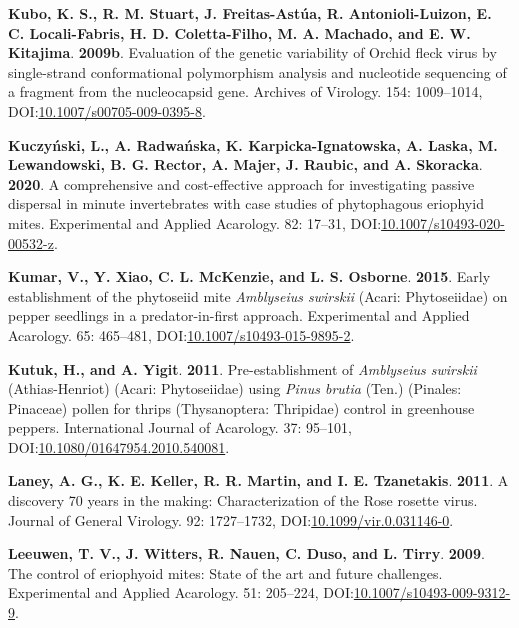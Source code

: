 \documentclass[12pt,final,CPage]{ufthesis}
\newlength{\cslhangindent}
\newenvironment{CSLReferences}[2] %
{%
	\setlength{\parindent}{0pt}
	\ifodd #1 \everypar{\setlength{\hangindent}{\cslhangindent}}\ignorespaces\fi
	\ifnum #2 > 0
	\setlength{\parskip}{#2\baselineskip}
	\fi
}%
{}
\begin{document}
{\begin{CSLReferences}{1}{0}
  \leavevmode{}%
  \textbf{Kubo, K. S., R. M. Stuart, J. Freitas-Astúa, R. Antonioli-Luizon, E. C. Locali-Fabris, H. D. Coletta-Filho, M. A. Machado, and E. W. Kitajima}. \textbf{2009b}. Evaluation of the genetic variability of {Orchid fleck virus} by single-strand conformational polymorphism analysis and nucleotide sequencing of a fragment from the nucleocapsid gene. Archives of Virology. 154: 1009--1014, DOI:\href{https://doi.org/10.1007/s00705-009-0395-8}{10.1007/s00705-009-0395-8}.

  \leavevmode{}%
  \textbf{Kuczyński, L., A. Radwańska, K. Karpicka-Ignatowska, A. Laska, M. Lewandowski, B. G. Rector, A. Majer, J. Raubic, and A. Skoracka}. \textbf{2020}. A comprehensive and cost-effective approach for investigating passive dispersal in minute invertebrates with case studies of phytophagous eriophyid mites. Experimental and Applied Acarology. 82: 17--31, DOI:\href{https://doi.org/10.1007/s10493-020-00532-z}{10.1007/s10493-020-00532-z}.

  \leavevmode{}%
  \textbf{Kumar, V., Y. Xiao, C. L. McKenzie, and L. S. Osborne}. \textbf{2015}. Early establishment of the phytoseiid mite {\emph{Amblyseius swirskii}} ({Acari}: {Phytoseiidae}) on pepper seedlings in a predator-in-first approach. Experimental and Applied Acarology. 65: 465--481, DOI:\href{https://doi.org/10.1007/s10493-015-9895-2}{10.1007/s10493-015-9895-2}.

  \leavevmode{}%
  \textbf{Kutuk, H., and A. Yigit}. \textbf{2011}. Pre-establishment of {\emph{Amblyseius swirskii}} {(Athias-Henriot)} {({Acari}: {Phytoseiidae})} using {\emph{Pinus brutia}} {(Ten.)} {(Pinales: Pinaceae)} pollen for thrips {(Thysanoptera: Thripidae)} control in greenhouse peppers. International Journal of Acarology. 37: 95--101, DOI:\href{https://doi.org/10.1080/01647954.2010.540081}{10.1080/01647954.2010.540081}.

  \leavevmode{}%
  \textbf{Laney, A. G., K. E. Keller, R. R. Martin, and I. E. Tzanetakis}. \textbf{2011}. A discovery 70 years in the making: Characterization of the {Rose rosette virus}. Journal of General Virology. 92: 1727--1732, DOI:\href{https://doi.org/10.1099/vir.0.031146-0}{10.1099/vir.0.031146-0}.

  \leavevmode{}%
  \textbf{Leeuwen, T. V., J. Witters, R. Nauen, C. Duso, and L. Tirry}. \textbf{2009}. The control of eriophyoid mites: State of the art and future challenges. Experimental and Applied Acarology. 51: 205--224, DOI:\href{https://doi.org/10.1007/s10493-009-9312-9}{10.1007/s10493-009-9312-9}.


\end{CSLReferences}}
\end{document}
